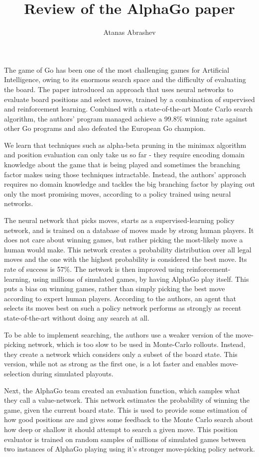 \documentclass{article}
\title{Review of the AlphaGo paper}
\author{Atanas Abrashev}
\begin{document}
\maketitle
The game of Go has been one of the most challenging games for Artificial Intelligence, owing to its enormous search space and the difficulty of evaluating the board.
The paper introduced an approach that uses neural networks to evaluate board positions and select moves, trained by a combination of supervised and reinforcement learning.
Combined with a state-of-the-art Monte Carlo search algorithm, the authors' program managed achieve a 99.8\% winning rate against other Go programs and also defeated the European Go champion.

We learn that techniques such as alpha-beta pruning in the minimax algorithm and position evaluation can only take us so far - they require encoding domain knowledge about the game that is being played and sometimes the branching factor makes using those techniques intractable. Instead, the authors' approach requires no domain knowledge and tackles the big branching factor by playing out only the most promising moves, according to a policy trained using neural networks.

The neural network that picks moves, starts as a supervised-learning policy network, and is trained on a database of moves made by strong human players. It does not care about winning games, but rather picking the most-likely move a human would make. This network creates a probability distribution over all legal moves and the one with the highest probability is considered the best move. Its rate of success is 57\%. The network is then improved using reinforcement-learning, using millions of simulated games, by having AlphaGo play itself. This puts a bias on winning games, rather than simply picking the best move according to expert human players. According to the authors, an agent that selects its moves best on such a policy network performs as strongly as recent state-of-the-art without doing any search at all.

To be able to implement searching, the authors use a weaker version of the move-picking network, which is too slow to be used in Monte-Carlo rollouts. Instead, they create a network which considers only a subset of the board state. This version, while not as strong as the first one, is a lot faster and enables move-selection during simulated playouts.

Next, the AlphaGo team created an evaluation function, which samples what they call a value-network. This network estimates the probability of winning the game, given the current board state. This is used to provide some estimation of how good positions are and gives some feedback to the Monte Carlo search about how deep or shallow it should attempt to search a given move. This position evaluator is trained on random samples of millions of simulated games between two instances of AlphaGo playing using it's stronger move-picking policy network.
\end{document}
